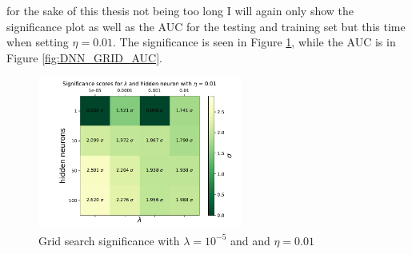 \documentclass[14pt, a4paper]{book}
\begin{document}
for the sake of this thesis not being too long I will again only show the significance plot as well as the AUC for the testing and training set but this time when setting $\eta=0.01$. 
The significance is seen in Figure \ref{fig:DNN_GRID_SIG}, while the AUC is in Figure \ref{fig:DNN_GRID_AUC}. 
\graphicspath{{../../../Plots/NeuralNetwork/FULL/GRID_layers_eta_neurons}}
\begin{figure}[!ht]
      \centering
      \includegraphics[width=0.6\textwidth]{Significance_nl.pdf}
      \caption{Grid search significance with $\lambda=10^{-5}$ and and $\eta = 0.01$}\label{fig:DNN_GRID_SIG}
\end{figure}
\end{document}

